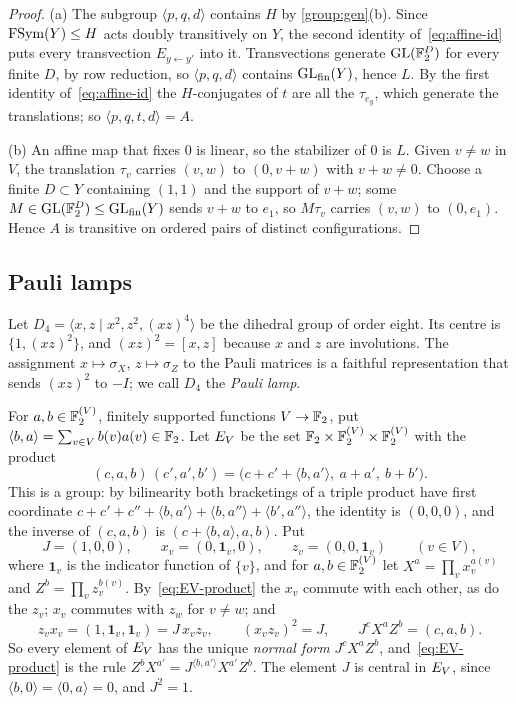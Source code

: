 \begin{proof}
(a) The subgroup $\langle p,q,d\rangle$ contains $H$ by \cref{group:gen}(b). Since $\operatorname{FSym}(Y)\le H$ acts doubly transitively on $Y$, the
second identity of~\eqref{eq:affine-id} puts every transvection $E_{y\leftarrow y'}$ into it. Transvections generate $\operatorname{GL}(\mathbb F_2^D)$ for every
finite $D$, by row reduction, so $\langle p,q,d\rangle$ contains $\operatorname{GL}_{\rm fin}(Y)$, hence $L$. By the first identity of~\eqref{eq:affine-id}
the $H$-conjugates of $t$ are all the $\tau_{e_y}$, which generate the translations; so $\langle p,q,t,d\rangle=A$.

(b) An affine map that fixes $0$ is linear, so the stabilizer of $0$ is $L$. Given $v\ne w$ in $V$, the translation $\tau_v$ carries $(v,w)$
to $(0,v+w)$ with $v+w\ne0$. Choose a finite $D\subset Y$ containing $(1,1)$ and the support of $v+w$; some $M\in\operatorname{GL}(\mathbb F_2^D)\le\operatorname{GL}_{\rm
fin}(Y)$ sends $v+w$ to $e_1$, so $M\tau_v$ carries $(v,w)$ to $(0,e_1)$. Hence $A$ is transitive on ordered pairs of distinct
configurations.
\end{proof}

\subsection{Pauli lamps}\label{sec:group-lamps}

Let $D_4=\langle x,z\mid x^2,z^2,(xz)^4\rangle$ be the dihedral group of order eight. Its centre is $\{1,(xz)^2\}$, and $(xz)^2=[x,z]$
because $x$ and $z$ are involutions. The assignment $x\mapsto\sigma_X$, $z\mapsto\sigma_Z$ to the Pauli matrices is a faithful
representation that sends $(xz)^2$ to $-I$; we call $D_4$ the \emph{Pauli lamp}.

For $a,b\in\mathbb F_2^{(V)}$, finitely supported functions $V\to\mathbb F_2$, put $\langle b,a\rangle=\sum_{v\in V}b(v)a(v)\in\mathbb F_2$. Let $E_V$ be the
set $\mathbb F_2\times\mathbb F_2^{(V)}\times\mathbb F_2^{(V)}$ with the product
\begin{equation}\label{eq:EV-product}
(c,a,b)\,(c',a',b')=\bigl(c+c'+\langle b,a'\rangle,\ a+a',\ b+b'\bigr).
\end{equation}
This is a group: by bilinearity both bracketings of a triple product have first coordinate
$c+c'+c''+\langle b,a'\rangle+\langle b,a''\rangle+\langle b',a''\rangle$, the identity is $(0,0,0)$, and the inverse of $(c,a,b)$ is
$(c+\langle b,a\rangle,a,b)$. Put
\[
J=(1,0,0),\qquad x_v=(0,\mathbf 1_v,0),\qquad z_v=(0,0,\mathbf 1_v)\qquad(v\in V),
\]
where $\mathbf 1_v$ is the indicator function of $\{v\}$, and for $a,b\in\mathbb F_2^{(V)}$ let $X^a=\prod_vx_v^{a(v)}$ and $Z^b=\prod_vz_v^{b(v)}$.
By~\eqref{eq:EV-product} the $x_v$ commute with each other, as do the $z_v$; $x_v$ commutes with $z_w$ for $v\ne w$; and
\[
z_vx_v=(1,\mathbf 1_v,\mathbf 1_v)=J\,x_vz_v,\qquad (x_vz_v)^2=J,\qquad J^cX^aZ^b=(c,a,b).
\]
So every element of $E_V$ has the unique \emph{normal form} $J^cX^aZ^b$, and~\eqref{eq:EV-product} is the rule
$Z^bX^{a'}=J^{\langle b,a'\rangle}X^{a'}Z^b$. The element $J$ is central in $E_V$, since $\langle b,0\rangle=\langle0,a\rangle=0$, and $J^2=1$.

